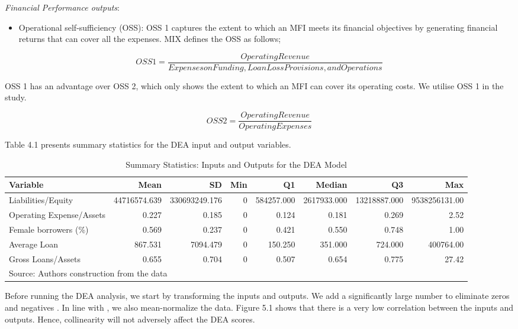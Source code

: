 \documentclass[a4paper, nobind]{templates/ociamthesis}
\providecommand{\tightlist}{%
  \setlength{\itemsep}{0pt}\setlength{\parskip}{0pt}}
\begin{document}
\emph{Financial Performance outputs}:

\begin{itemize}
\tightlist
\item
  Operational self-sufficiency (OSS): OSS 1 captures the extent to which an MFI meets its financial objectives by generating financial returns that can cover all the expenses. MIX defines the OSS as follows;
\end{itemize}

\begin{equation}
OSS1 = \frac{Operating Revenue}{Expenses on Funding, Loan Loss Provisions, and Operations}
\end{equation}

OSS 1 has an advantage over OSS 2, which only shows the extent to which an MFI can cover its operating costs. We utilise OSS 1 in the study.

\begin{equation}
OSS2 = \frac{Operating Revenue}{Operating Expenses}
\end{equation}

Table 4.1 presents summary statistics for the DEA input and output variables.

\begin{table}

\caption{\label{tab:unnamed-chunk-109}Summary Statistics: Inputs and Outputs for the DEA Model}
\centering
\fontsize{10}{12}\selectfont
\begin{tabular}[t]{lrrrrrrr}
\toprule
Variable & Mean & SD & Min & Q1 & Median & Q3 & Max\\
\midrule
Liabilities/Equity & 44716574.639 & 330693249.176 & 0 & 584257.000 & 2617933.000 & 13218887.000 & 9538256131.00\\
Operating Expense/Assets & 0.227 & 0.185 & 0 & 0.124 & 0.181 & 0.269 & 2.52\\
Female borrowers (\%) & 0.569 & 0.237 & 0 & 0.421 & 0.550 & 0.748 & 1.00\\
Average Loan & 867.531 & 7094.479 & 0 & 150.250 & 351.000 & 724.000 & 400764.00\\
Gross Loans/Assets & 0.655 & 0.704 & 0 & 0.507 & 0.654 & 0.775 & 27.42\\
\bottomrule
\multicolumn{8}{l}{\rule{0pt}{1em}Source: Authors construction from the data}\\
\end{tabular}
\end{table}

Before running the DEA analysis, we start by transforming the inputs and outputs. We add a significantly large number to eliminate zeros and negatives \autocite{ataullah2006economic}. In line with \textcite{avkiran2006productivity}, we also mean-normalize the data. Figure 5.1 shows that there is a very low correlation between the inputs and outputs. Hence, collinearity will not adversely affect the DEA scores.
\end{document}
